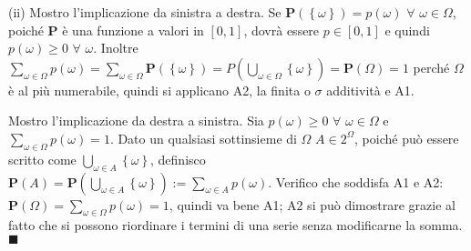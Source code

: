 \documentclass{article}
\begin{document}
(ii) Mostro l'implicazione da sinistra a destra. Se $\mathbf{P}\left(
\left\{ \omega \right\} \right) =p\left( \omega \right) $ $\forall $ $\omega
\in \Omega $, poich\'{e} $\mathbf{P}$ \`{e} una funzione a valori in $\left[
0,1\right] $, dovr\`{a} essere $p\in \left[ 0,1\right] $ e quindi $p\left(
\omega \right) \geq 0$ $\forall $ $\omega $. Inoltre $\sum_{\omega \in \Omega }p\left( \omega
\right) =\sum_{\omega \in \Omega }\mathbf{P}\left( \left\{ \omega \right\}
\right) =P\left( \bigcup_{\omega \in \Omega }\left\{ \omega \right\} \right)
=\mathbf{P}\left( \Omega \right) =1$ perch\'{e} $\Omega $ \`{e} al pi\`{u}
numerabile, quindi si applicano A2, la finita o $\sigma $ additivit\`{a} e
A1.

Mostro l'implicazione da destra a sinistra. Sia $p\left( \omega \right) \geq
0$ $\forall $ $\omega \in \Omega $ e $\sum_{\omega \in \Omega }p\left(
\omega \right) =1$. Dato un qualsiasi sottinsieme di $\Omega $ $A\in
2^{\Omega }$, poich\'{e} pu\`{o} essere scritto come $\bigcup_{\omega \in
A}\left\{ \omega \right\} $, definisco $\mathbf{P}\left( A\right) =\mathbf{P}%
\left( \bigcup_{\omega \in A}\left\{ \omega \right\} \right) :=\sum_{\omega
\in A}p\left( \omega \right) $. Verifico che soddisfa A1 e A2: $\mathbf{P}%
\left( \Omega \right) =\sum_{\omega \in \Omega }p\left( \omega \right) =1$,
quindi va bene A1; A2 si pu\`{o} dimostrare grazie al fatto che si possono
riordinare i termini di una serie senza modificarne la somma. $\blacksquare $
\end{document}
